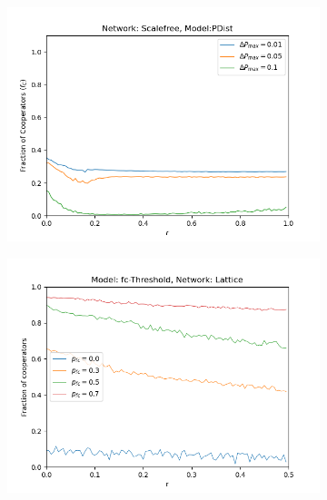 \documentclass[11pt, A4 paper, twocolumn ]{article}
\begin{document}
\begin{figure}[p]
\begin{subfigure}[b]{0.3\textwidth}
			\includegraphics[width=\textwidth]{graphs/sf-pdist}
			\caption{}
			\label{fig:sf-pdist}
		\end{subfigure}
	\begin{subfigure}[b]{0.3\textwidth}
		\centering
		\includegraphics[width=\textwidth]{graphs/varying-pfc-latb2}
		\caption{}
		\label{fig:lat-fct}
	\end{subfigure}
	\begin{subfigure}[b]{0.3\textwidth}
		\centering

\end{subfigure}
\end{figure}
\end{document}
